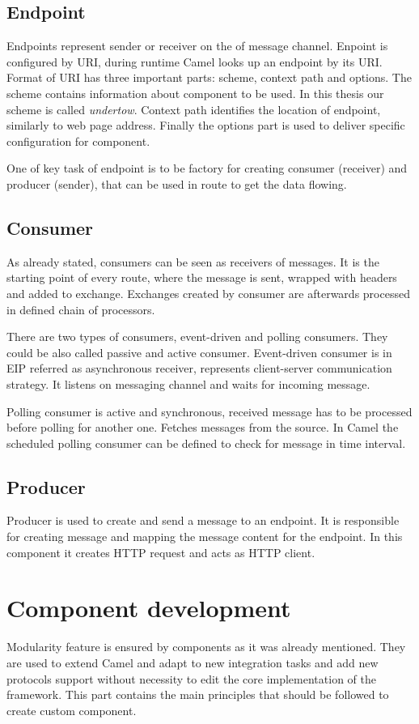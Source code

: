 \documentclass[12pt,final,oneside]{fithesis2}
\begin{document}
\subsection*{Endpoint}
Endpoints represent sender or receiver on the of message channel. Enpoint is configured by URI, during runtime Camel looks up an endpoint by its URI. Format of URI has three important parts: scheme, context path and options. The scheme contains information about component to be used. In this thesis our scheme is called \textit{undertow}. Context path identifies the location of endpoint, similarly to web page address. Finally the options part is used to deliver specific configuration for component.

One of key task of endpoint is to be factory for creating consumer (receiver) and producer (sender), that can be used in route to get the data flowing.  

\subsection*{Consumer}
As already stated, consumers can be seen as receivers of messages. It is the starting point of every route, where the message is sent, wrapped with headers and added to exchange. Exchanges created by consumer are afterwards processed in defined chain of processors. 

There are two types of consumers, event-driven and polling consumers. They could be also called passive and active consumer. Event-driven consumer is in EIP referred as asynchronous receiver, represents client-server communication strategy. It listens on messaging channel and waits for incoming message. 

Polling consumer is active and synchronous, received message has to be processed before polling for another one. Fetches messages from the source. In Camel the scheduled polling consumer can be defined to check for message in time interval.  


\subsection*{Producer}
Producer is used to create and send a message to an endpoint. It is responsible for creating message and mapping the message content for the endpoint. In this component it creates HTTP request and acts as HTTP client.


\section{Component development}
Modularity feature is ensured by components as it was already mentioned. They are used to extend Camel and adapt to new integration tasks and add new protocols support without necessity to edit the core implementation of the framework. This part contains the main principles that should be followed to create custom component.
\end{document}
